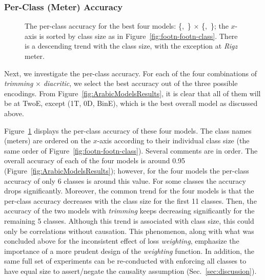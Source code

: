 \subsubsection{Per-Class (Meter) Accuracy}\label{sec:per-class-accuracy}
\begin{figure}[!tb]
  \centering
  
  \caption{The per-class accuracy for the best four models: \{,\ \} $\times$
    \{,\ \}; the $x$-axis is sorted by class size as in
    Figure~\ref{fig:footn-footn-class}. There is a descending trend with the class size, with the
    exception at \textit{Rigz} meter.}\label{fig:footn-both-models}
\end{figure}
Next, we investigate the per-class accuracy. For each of the four combinations of
\textit{trimming} $\times$ \textit{diacritic}, we select the best accuracy out of the three possible
encodings. From Figure~\ref{fig:ArabicModelsResults}, it is clear that all of them will be at TwoE,
except (1T, 0D, BinE), which is the best overall model as discussed above.

Figure~\ref{fig:footn-both-models} displays the per-class accuracy of these four models. The class
names (meters) are ordered on the $x$-axis according to their individual class size (the same order
of Figure~\ref{fig:footn-footn-class}). Several comments are in order. The overall accuracy of each of
the four models is around 0.95 (Figure~\ref{fig:ArabicModelsResults}); however, for the four models
the per-class accuracy of only 6 classes is around this value. For some classes the accuracy drops
significantly. Moreover, the common trend for the four models is that the per-class accuracy
decreases with the class size for the first 11 classes. Then, the accuracy of the two models with
\textit{trimming} keeps decreasing significantly for the remaining 5 classes. Although this
trend is associated with class size, this could only be correlations without causation. This
phenomenon, along with what was concluded above for the inconsistent effect of loss
\textit{weighting}, emphasize the importance of a more prudent design of the \textit{weighting}
function. In addition, the same full set of experiments can be re-conducted with enforcing all
classes to have equal size to assert/negate the causality assumption (Sec.~\ref{sec:discussion}).

\bigskip

